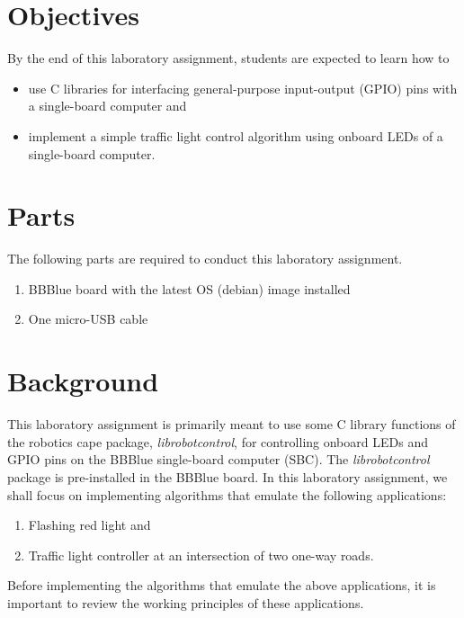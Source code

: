 \section{Objectives}
By the end of this laboratory assignment, students are expected to learn how to 

\begin{itemize}

\item use C libraries for interfacing general-purpose input-output (GPIO) pins with a single-board computer and   
  
\item implement a simple traffic light control algorithm using onboard LEDs of a single-board computer.  
 
  
\end{itemize}

\section{Parts}
\label{sec:partsTLC}
The following parts are required to conduct this laboratory assignment. %
%
\begin{enumerate}
\item BBBlue board with the latest OS (debian) image installed
\item One micro-USB cable  
\end{enumerate}

\section{Background}
\label{sec:background}

This laboratory assignment is primarily meant to use some C library functions of the robotics cape package, \emph{librobotcontrol}, for controlling onboard LEDs and GPIO pins on the BBBlue single-board computer (SBC). The \emph{librobotcontrol} package is pre-installed in the BBBlue board. In this laboratory assignment, we shall focus on implementing  algorithms that emulate the following applications:
%
\begin{enumerate}
    \item Flashing red light and 
    \item Traffic light controller at an intersection of two one-way roads.
\end{enumerate}
%

Before implementing the algorithms that emulate the above applications, it is important to review the working principles of these applications.

